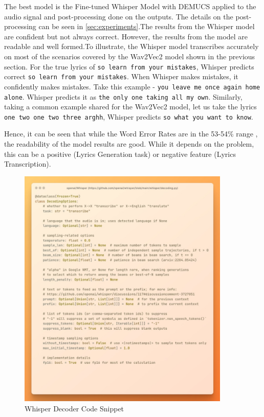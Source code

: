 The best model is the Fine-tuned Whisper Model with DEMUCS applied to the audio signal and post-processing done on the outputs. The details on the post-processing can be seen in \ref{sec:experiments}.The results from the Whisper model are confident but not always correct. However, the results from the model are readable and well formed.To illustrate, the Whisper model transcribes accurately on most of the scenarios covered by the Wav2Vec2 model shown in the previous section. For the true lyrics of \texttt{so learn from your mistakes}, Whisper predicts correct \texttt{so learn from your mistakes}. When Whisper makes mistakes, it confidently makes mistakes. Take this example - \texttt{you leave me once again home alone}. Whisper predicts it as \texttt{the only one taking all my own}. Similarly, taking a common example shared for the Wav2Vec2 model, let us take the lyrics \texttt{one two one two three arghh}, Whisper predicts \texttt{so what you want to know}. 

Hence, it can be seen that while the Word Error Rates are in the 53-54\% range , the readability of the model results are good. While it depends on the problem, this can be a positive (Lyrics Generation task) or negative feature (Lyrics Transcription).


\begin{figure}
    \centering
    \includegraphics[width=0.9\textwidth]{05-research study/figures/whisper-decoder-code-snippet.pdf}
    \caption{Whisper Decoder Code Snippet}
    \label{fig:whisper-code-snippet}
\end{figure}


